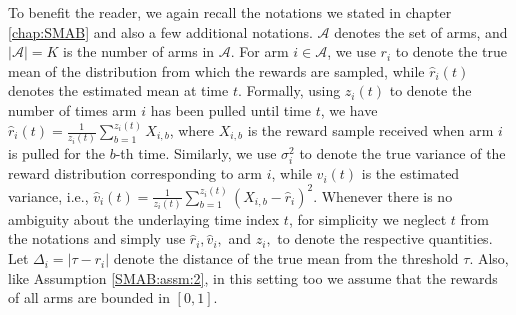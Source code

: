 To benefit the reader, we again recall the notations we stated in chapter \ref{chap:SMAB} and also a few additional notations. $\mathcal{A}$ denotes the set of arms, and $|\mathcal{A}|=K$ is the number of arms in $\mathcal{A}$. For arm $i\in\mathcal{A}$, we use $r_{i}$ to denote the true mean of the distribution from which the rewards are sampled, while $\hat{r}_{i}(t)$ denotes the estimated mean at time $t$. Formally, using $z_i(t)$ to denote the number of times arm $i$ has been pulled until time $t$, we have $\hat{r}_{i}(t)=\frac{1}{z_{i}(t)}\sum_{b=1}^{z_i(t)} X_{i,b}$, where $X_{i,b}$ is the reward sample received when arm $i$ is pulled for the $b$-th time. %
Similarly, we use $\sigma_{i}^{2}$ to denote the true variance of the reward distribution corresponding to arm $i$, while $\hat{v}_{i}(t)$ is the estimated variance, i.e., $\hat{v}_{i}(t)=\frac{1}{z_i(t)}\sum_{b=1}^{z_{i}(t)}(X_{i,b}-\hat{r}_{i})^{2}$. Whenever there is no ambiguity about the underlaying  time index $t$, for simplicity we neglect $t$ from the notations and simply use  $\hat{r}_i, \hat{v}_i,$ and $z_i, $ to denote the respective quantities.  Let  $\Delta_{i}=|\tau-r_{i}|$ denote the distance of the true mean from the threshold $\tau$. Also, like Assumption \ref{SMAB:assm:2}, in this setting too we assume that the rewards of all arms are bounded in $[0,1]$.


